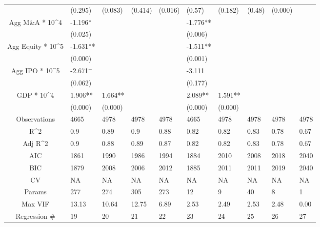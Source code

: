 \documentclass{article}
\begin{document}
\begin{table}[H]
\begin{tabular}{|clllllllll|}
   & (0.295) & (0.083) & (0.414) & (0.016) & (0.57) & (0.182) & (0.48) & (0.000) &  \\ 
  Agg M\&A * 10^4 & -1.196* &  &  &  & -1.776** &  &  &  &  \\ 
   & (0.025) &  &  &  & (0.006) &  &  &  &  \\ 
  Agg Equity * 10^5 & -1.631** &  &  &  & -1.511** &  &  &  &  \\ 
   & (0.000) &  &  &  & (0.001) &  &  &  &  \\ 
  Agg IPO * 10^5 & -2.671$^{+}$ &  &  &  & -3.111 &  &  &  &  \\ 
   & (0.062) &  &  &  & (0.177) &  &  &  &  \\ 
  GDP * 10^4 & 1.906** & 1.664** &  &  & 2.089** & 1.591** &  &  &  \\ 
   & (0.000) & (0.000) &  &  & (0.000) & (0.000) &  &  &  \\ 
  \hline 
 Observations & 4665 & 4978 & 4978 & 4978 & 4665 & 4978 & 4978 & 4978 & 4978 \\ 
  R^2 & 0.9 & 0.89 & 0.9 & 0.88 & 0.82 & 0.82 & 0.83 & 0.78 & 0.67 \\ 
  Adj R^2 & 0.9 & 0.88 & 0.89 & 0.87 & 0.82 & 0.82 & 0.83 & 0.78 & 0.67 \\ 
  AIC & 1861 & 1990 & 1986 & 1994 & 1884 & 2010 & 2008 & 2018 & 2040 \\ 
  BIC & 1879 & 2008 & 2006 & 2012 & 1885 & 2011 & 2011 & 2019 & 2040 \\ 
  CV & NA & NA & NA & NA & NA & NA & NA & NA & NA \\ 
  Params & 277 & 274 & 305 & 273 & 12 & 9 & 40 & 8 & 1 \\ 
  Max VIF & 13.13 & 10.64 & 12.75 & 6.89 & 2.53 & 2.49 & 2.53 & 2.48 & 0.00 \\ 
  Regression \# & 19 & 20 & 21 & 22 & 23 & 24 & 25 & 26 & 27 \\ 
   \hline
\end{tabular}
 
\end{table}
\end{document}
